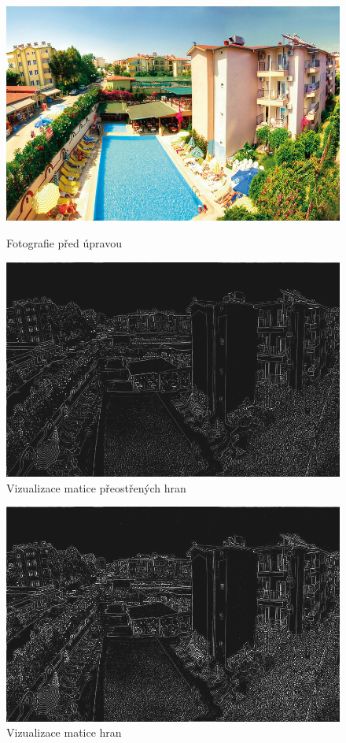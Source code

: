 \begin{figure}[!htb]
	\includegraphics[width=\linewidth]{attachements/sharpness-original.png}
	\caption{Fotografie před úpravou}\label{fig:sharpness-original}
	\endminipage\hfill
	\includegraphics[width=\linewidth]{attachements/oversharpness-matrix.png}
	\caption{Vizualizace matice přeostřených hran}\label{fig:oversharpness-matrix}
	\endminipage\hfill
\end{figure}

\begin{figure}[!htb]
	\includegraphics[width=\linewidth]{attachements/sharpness-matrix.png}
	\caption{Vizualizace matice hran}\label{fig:sharpness-matrix}
	\endminipage\hfill
\end{figure}

